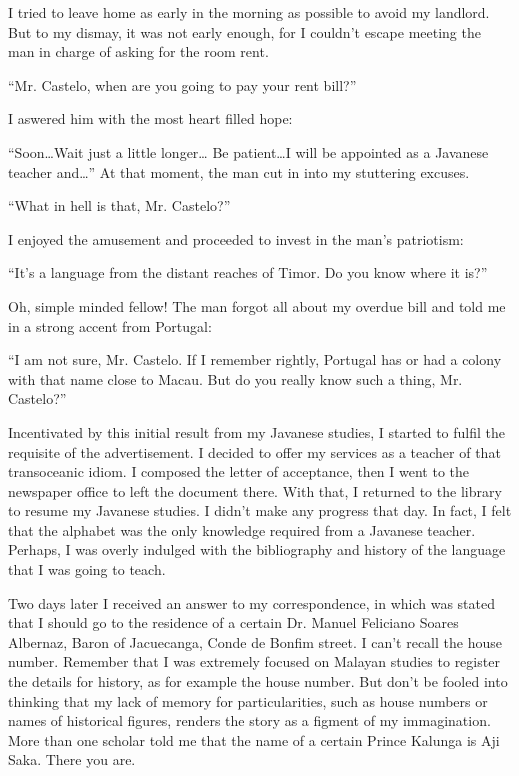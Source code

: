 \documentclass[a4paper,12pt]{book}
\begin{document}
I tried to leave home as early in the morning
as possible to avoid my landlord.
But to my dismay, it was not early enough,
for I couldn't escape meeting the man
in charge of asking for the room rent.

``Mr. Castelo, when are you going to
pay your rent bill?''

I aswered him with the most heart filled hope:

``Soon\ldots Wait just a little longer\ldots
Be patient\ldots I will be appointed as a
Javanese teacher and\ldots''
At that moment, the man cut in into my stuttering
excuses.

``What in hell is that, Mr. Castelo?''

I enjoyed the amusement
and proceeded to invest
in the man's patriotism:

``It's a language from the distant reaches of Timor.
Do you know where it is?''

Oh, simple minded fellow! The man forgot all about
my overdue bill and told me in a strong accent
from Portugal:

``I am not sure, Mr. Castelo. If I remember rightly,
Portugal has or had a colony with that name
close to Macau. But do you
really know such a thing, Mr. Castelo?''

Incentivated by this initial result from
my Javanese studies,
I started to fulfil the requisite of the advertisement.
I decided to offer my services as a teacher of
that transoceanic idiom. I composed the letter of
acceptance, then I went to the newspaper
office to left the document there.
With that, I returned
to the library to resume my Javanese studies.
I didn't make any progress that day. In fact, I
felt that the alphabet was the only knowledge
required from a Javanese teacher. Perhaps,
I was overly indulged with the
bibliography and history of the
language that I was going to teach.

Two days later I received an answer to my correspondence,
in which was stated
that I should go to the residence of
a certain Dr. Manuel Feliciano Soares Albernaz,
Baron of Jacuecanga,
Conde de Bonfim street.
I can't recall the house
number. Remember that  I was extremely focused
on Malayan studies to register the details
for history, as for example the house number.
But don't be fooled into thinking that
my lack of memory for particularities,
such as house numbers or names of historical
figures, renders the story as a figment
of my immagination. More than one scholar
told me that the  name of a certain
Prince Kalunga 
is Aji Saka. 
There you are.
\end{document}
